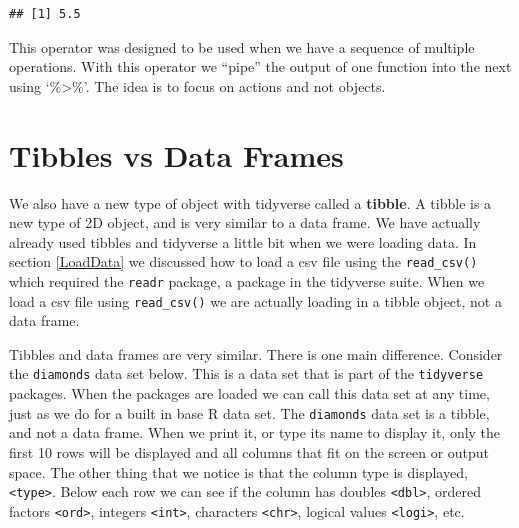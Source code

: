 \documentclass[
]{book}
\newenvironment{Shaded}{\begin{snugshade}}{\end{snugshade}}
\newcommand{\DecValTok}[1]{\textcolor[rgb]{0.00,0.00,0.81}{#1}}
\newcommand{\KeywordTok}[1]{\textcolor[rgb]{0.13,0.29,0.53}{\textbf{#1}}}
\newcommand{\NormalTok}[1]{#1}
\newcommand{\OperatorTok}[1]{\textcolor[rgb]{0.81,0.36,0.00}{\textbf{#1}}}
\newcommand{\StringTok}[1]{\textcolor[rgb]{0.31,0.60,0.02}{#1}}
\begin{document}
\begin{Shaded}
\end{Shaded}

\begin{verbatim}
## [1] 5.5
\end{verbatim}

This operator was designed to be used when we have a sequence of multiple operations. With this operator we ``pipe'' the output of one function into the next using `\%\textgreater\%'. The idea is to focus on actions and not objects.

\hypertarget{tibbles-vs-data-frames}{%
\section{Tibbles vs Data Frames}\label{tibbles-vs-data-frames}}

We also have a new type of object with tidyverse called a \textbf{tibble}. A tibble is a new type of 2D object, and is very similar to a data frame. We have actually already used tibbles and tidyverse a little bit when we were loading data. In section \ref{LoadData} we discussed how to load a csv file using the \texttt{read\_csv()} which required the \texttt{readr} package, a package in the tidyverse suite. When we load a csv file using \texttt{read\_csv()} we are actually loading in a tibble object, not a data frame.

Tibbles and data frames are very similar. There is one main difference. Consider the \texttt{diamonds} data set below. This is a data set that is part of the \texttt{tidyverse} packages. When the packages are loaded we can call this data set at any time, just as we do for a built in base R data set. The \texttt{diamonds} data set is a tibble, and not a data frame. When we print it, or type its name to display it, only the first 10 rows will be displayed and all columns that fit on the screen or output space. The other thing that we notice is that the column type is displayed, \texttt{\textless{}type\textgreater{}}. Below each row we can see if the column has doubles \texttt{\textless{}dbl\textgreater{}}, ordered factors \texttt{\textless{}ord\textgreater{}}, integers \texttt{\textless{}int\textgreater{}}, characters \texttt{\textless{}chr\textgreater{}}, logical values \texttt{\textless{}logi\textgreater{}}, etc.
\end{document}
